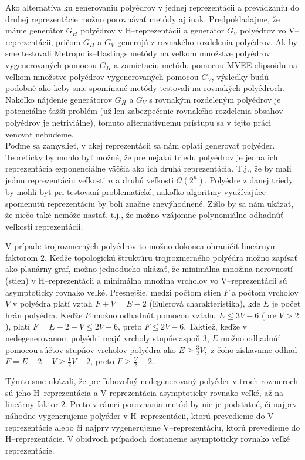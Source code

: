 Ako alternatíva ku generovaniu polyédrov v jednej reprezentácii a prevádzaniu do druhej reprezentácie možno porovnávať metódy aj inak. 
Predpokladajme, že máme generátor $G_H$ polyédrov v H--reprezentácii a generátor $G_V$ polyédrov vo V--reprezentácii, pričom $G_H$ a $G_V$ generujú z rovnakého rozdelenia polyédrov.
Ak by sme testovali Metropolis--Hastings metódy na veľkom množstve polyédrov vygenerovaných pomocou $G_H$ a zamietaciu metódu pomocou MVEE elipsoidu na veľkom množstve polyédrov vygenerovaných pomocou $G_V$, výsledky budú podobné ako keby sme spomínané metódy testovali na rovnakých polyédroch.
Nakoľko nájdenie generátorov $G_H$ a $G_V$ s rovnakým rozdeleným polyédrov je potenciálne ťažší problém (už len zabezpečenie rovnakého rozdelenia obsahov polyédrov je netriviálne), tomuto alternatívnemu prístupu sa v tejto práci venovať nebudeme. \label{2-generatory}\\

Poďme sa zamyslieť, v akej reprezentácii sa nám oplatí generovať polyéder. Teoreticky by mohlo byť možné, že pre nejakú triedu polyédrov je jedna ich reprezentácia exponenciálne väčšia ako ich druhá reprezentácia. T.j., že by mali jednu reprezentáciu veľkosti $n$ a druhú veľkosti $\mathcal O(2^n)$. Polyédre z danej triedy by mohli byť pri testovaní problematické, nakoľko algoritmy využívajúce spomenutú reprezentáciu by boli značne znevýhodnené. Zišlo by sa nám ukázať, že niečo také nemôže nastať, t.j., že možno vzájomne polynomiálne odhadnúť veľkosti reprezentácii.

V prípade trojrozmerných polyédrov to možno dokonca ohraničiť lineárnym faktorom $2$. Kedže topologickú štruktúru trojrozmerného polyédra možno zapísať ako planárny graf, možno jednoducho ukázať, že minimálna množina nerovností (stien) v H--reprezentácii a minimálna množina vrcholov vo V--reprezentácii sú asymptoticky rovnako veľké.
Presnejšie, medzi počtom stien $F$ a počtom vrcholov $V$ v polyédra platí vzťah $F+V=E-2$ (Eulerová charakteristika), kde $E$ je počet hrán polyédra. Keďže $E$ možno odhadnúť pomocou vzťahu $E \le 3V-6$ (pre $V>2$), platí $F=E-2-V \leq 2V-6$, preto $F \leq 2V-6$. Taktiež, keďže v nedegenerovanom polyédri majú vrcholy stupňe aspoň $3$, $E$ možno odhadnúť pomocou súčtov stupňov vrcholov polyédra ako $E \geq \frac{3}{2}V,$ z čoho získavame odhad $F=E-2-V \geq \frac 1 2 V-2$, preto $F \geq \frac V 2 -2$.

Týmto sme ukázali, že pre ľubovoľný nedegenerovaný polyéder v troch rozmeroch sú jeho H--reprezentácia a V reprezentácia asymptoticky rovnako veľké, až na lineárny faktor $2$.
Preto v rámci porovnania metód by nie je podstatné, či najprv náhodne vygenerujeme polyéder v H--reprezentácii, ktorú prevedieme do V--reprezentácie alebo či najprv vygenerujeme V--reprezentáciu, ktorú prevedieme do H--reprezentácie. V obidvoch prípadoch dostaneme asymptoticky rovnako veľké reprezentácie.

